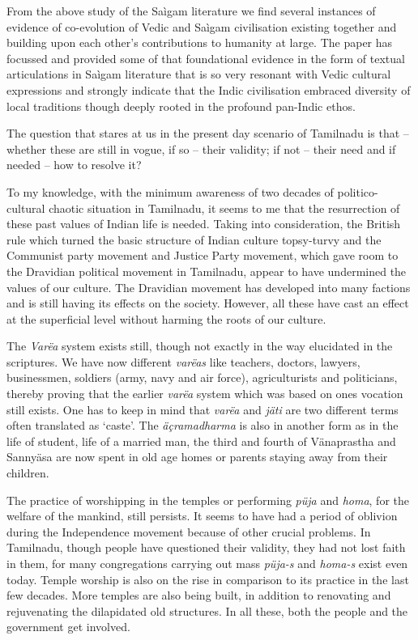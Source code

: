 From the above study of the Saìgam literature we find several instances of evidence of co-evolution of Vedic and Saìgam civilisation existing together and building upon each other’s contributions to humanity at large. The paper has focussed and provided some of that foundational evidence in the form of textual articulations in Saìgam literature that is so very resonant with Vedic cultural expressions and strongly indicate that the Indic civilisation embraced diversity of local traditions though deeply rooted in the profound pan-Indic ethos.

The question that stares at us in the present day scenario of Tamilnadu is that – whether these are still in vogue, if so – their validity; if not – their need and if needed – how to resolve it?

To my knowledge, with the minimum awareness of two decades of politico-cultural chaotic situation in Tamilnadu, it seems to me that the resurrection of these past values of Indian life is needed. Taking into consideration, the British rule which turned the basic structure of Indian culture topsy-turvy and the Communist party movement and Justice Party movement, which gave room to the Dravidian political movement in Tamilnadu, appear to have undermined the values of our culture. The Dravidian movement has developed into many factions and is still having its effects on the society. However, all these have cast an effect at the superficial level without harming the roots of our culture.

The \textit{Varëa} system exists still, though not exactly in the way elucidated in the scriptures. We have now different \textit{varëas} like teachers, doctors, lawyers, businessmen, soldiers (army, navy and air force), agriculturists and politicians, thereby proving that the earlier \textit{varëa} system which was based on ones vocation still exists. One has to keep in mind that \textit{varëa} and \textit{jäti} are two different terms often translated as ‘caste’. The \textit{äçramadharma} is also in another form as in the life of student, life of a married man, the third and fourth of Vänaprastha and Sannyäsa are now spent in old age homes or parents staying away from their children.

The practice of worshipping in the temples or performing \textit{püja} and \textit{homa}, for the welfare of the mankind, still persists. It seems to have had a period of oblivion during the Independence movement because of other crucial problems. In Tamilnadu, though people have questioned their validity, they had not lost faith in them, for many congregations carrying out mass \textit{püja-s} and \textit{homa-s} exist even today. Temple worship is also on the rise in comparison to its practice in the last few decades. More temples are also being built, in addition to renovating and rejuvenating the dilapidated old structures. In all these, both the people and the government get involved.

